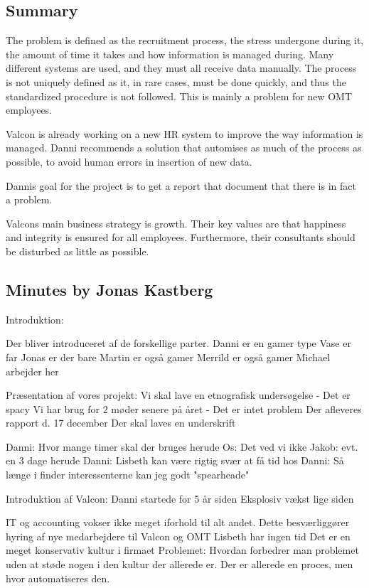 \label{app:danni_initiation}

\subsection{Summary}

The problem is defined as the recruitment process, the stress undergone during it, the amount of time it takes and how information is managed during. Many different systems are used, and they must all receive data manually.
The process is not uniquely defined as it, in rare cases, must be done quickly, and thus the standardized procedure is not followed. This is mainly a problem for new OMT employees.

Valcon is already working on a new HR system to improve the way information is managed. Danni recommends a solution that automises as much of the process as possible, to avoid human errors in insertion of new data.

Dannis goal for the project is to get a report that document that there is in fact a problem.

Valcons main business strategy is growth.
Their key values are that happiness and integrity is ensured for all employees. Furthermore, their consultants should be disturbed as little as possible.

\subsection{Minutes by Jonas Kastberg}
Introduktion:

Der bliver introduceret af de forskellige parter.
Danni er en gamer type
Vase er far
Jonas er der bare
Martin er også gamer
Merrild er også gamer
Michael arbejder her

Præsentation af vores projekt:
Vi skal lave en etnografisk undersøgelse
	- Det er spacy
Vi har brug for 2 møder senere på året
	- Det er intet problem
Der afleveres rapport d. 17 december
Der skal laves en underskrift



Danni: Hvor mange timer skal der bruges herude
Os: Det ved vi ikke
Jakob: evt. en 3 dage herude
Danni: Lisbeth kan være rigtig svær at få tid hos
Danni: Så længe i finder interessenterne kan jeg godt "spearheade"


Introduktion af Valcon:
Danni startede for 5 år siden
Eksplosiv vækst lige siden

IT og accounting vokser ikke meget iforhold til alt andet.
Dette besværliggører hyring af nye medarbejdere til Valcon og OMT
Lisbeth har ingen tid
Det er en meget konservativ kultur i firmaet
Problemet: Hvordan forbedrer man problemet uden at støde nogen i den kultur der allerede er.
Der er allerede en proces, men hvor automatiseres den.

